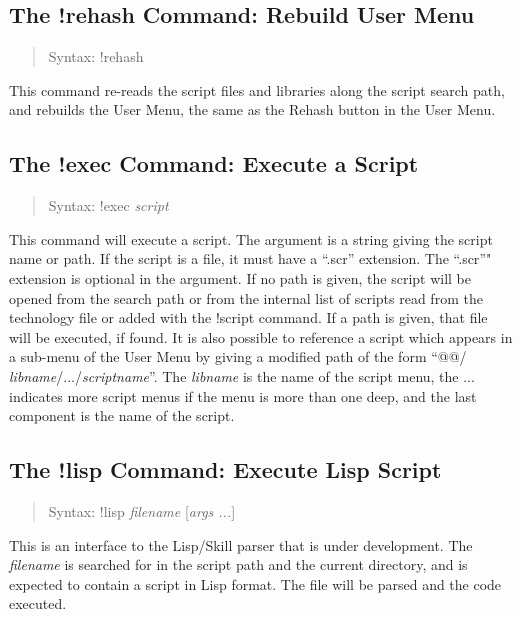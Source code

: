 \subsection{The {\cb !rehash} Command: Rebuild User Menu}
\begin{quote}
Syntax: {\vt !rehash}
\end{quote}
This command re-reads the script files and libraries along the script
search path, and rebuilds the {\cb User Menu}, the same as the {\cb
Rehash} button in the {\cb User Menu}.

\subsection{The {\cb !exec} Command: Execute a Script}
\begin{quote}
Syntax: {\vt !exec {\it script\/}}
\end{quote}
This command will execute a script.  The argument is a string giving
the script name or path.  If the script is a file, it must have a
``{\vt .scr}'' extension.  The ``{\vt .scr}''" extension is optional
in the argument.  If no path is given, the script will be opened from
the search path or from the internal list of scripts read from the
technology file or added with the {\cb !script} command.  If a path is
given, that file will be executed, if found.  It is also possible to
reference a script which appears in a sub-menu of the {\cb User Menu}
by giving a modified path of the form ``{\vt @@/{\it
libname}/.../{\it scriptname}}''.  The {\it libname} is the name of
the script menu, the ...  indicates more script menus if the menu is
more than one deep, and the last component is the name of the script.

\subsection{The {\cb !lisp} Command: Execute Lisp Script}
\begin{quote}
Syntax: {\vt !lisp} {\it filename} [{\it args ...\/}]
\end{quote}
This is an interface to the Lisp/Skill parser that is under
development.  The {\it filename} is searched for in the script path
and the current directory, and is expected to contain a script in Lisp
format.  The file will be parsed and the code executed.

